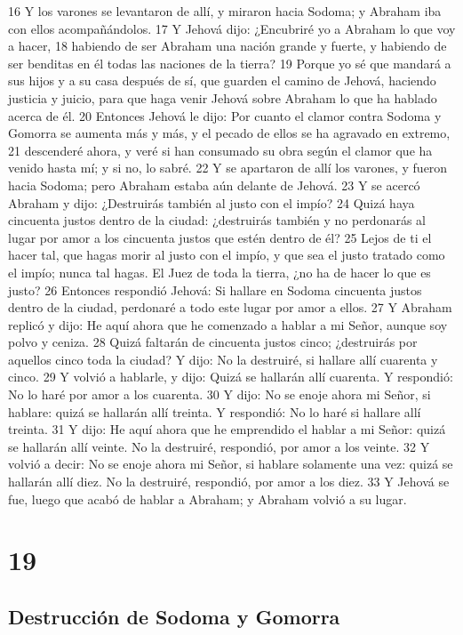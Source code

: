 16 Y los varones se levantaron de allí, y miraron hacia Sodoma; y Abraham iba con ellos acompañándolos.
17 Y Jehová dijo: ¿Encubriré yo a Abraham lo que voy a hacer,
18 habiendo de ser Abraham una nación grande y fuerte, y habiendo de ser benditas en él todas las naciones de la tierra?
19 Porque yo sé que mandará a sus hijos y a su casa después de sí, que guarden el camino de Jehová, haciendo justicia y juicio, para que haga venir Jehová sobre Abraham lo que ha hablado acerca de él.
20 Entonces Jehová le dijo: Por cuanto el clamor contra Sodoma y Gomorra se aumenta más y más, y el pecado de ellos se ha agravado en extremo,
21 descenderé ahora, y veré si han consumado su obra según el clamor que ha venido hasta mí; y si no, lo sabré.
22 Y se apartaron de allí los varones, y fueron hacia Sodoma; pero Abraham estaba aún delante de Jehová.
23 Y se acercó Abraham y dijo: ¿Destruirás también al justo con el impío?
24 Quizá haya cincuenta justos dentro de la ciudad: ¿destruirás también y no perdonarás al lugar por amor a los cincuenta justos que estén dentro de él?
25 Lejos de ti el hacer tal, que hagas morir al justo con el impío, y que sea el justo tratado como el impío; nunca tal hagas. El Juez de toda la tierra, ¿no ha de hacer lo que es justo?
26 Entonces respondió Jehová: Si hallare en Sodoma cincuenta justos dentro de la ciudad, perdonaré a todo este lugar por amor a ellos.
27 Y Abraham replicó y dijo: He aquí ahora que he comenzado a hablar a mi Señor, aunque soy polvo y ceniza.
28 Quizá faltarán de cincuenta justos cinco; ¿destruirás por aquellos cinco toda la ciudad? Y dijo: No la destruiré, si hallare allí cuarenta y cinco.
29 Y volvió a hablarle, y dijo: Quizá se hallarán allí cuarenta. Y respondió: No lo haré por amor a los cuarenta.
30 Y dijo: No se enoje ahora mi Señor, si hablare: quizá se hallarán allí treinta. Y respondió: No lo haré si hallare allí treinta.
31 Y dijo: He aquí ahora que he emprendido el hablar a mi Señor: quizá se hallarán allí veinte. No la destruiré, respondió, por amor a los veinte.
32 Y volvió a decir: No se enoje ahora mi Señor, si hablare solamente una vez: quizá se hallarán allí diez. No la destruiré, respondió, por amor a los diez.
33 Y Jehová se fue, luego que acabó de hablar a Abraham; y Abraham volvió a su lugar.

\chapter{19}

\section{Destrucción de Sodoma y Gomorra}


